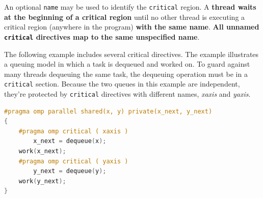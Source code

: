 \noindent
An optional \texttt{name} may be used to identify the \texttt{critical} region. A \textbf{thread waits at the beginning of a critical region} until no other thread is executing a critical region (anywhere in the program) \textbf{with the same name}. \textbf{All unnamed \texttt{critical} directives map to the same unspecified name}.

\begin{examplebox}
    The following example includes several critical directives. The example illustrates a queuing model in which a task is dequeued and worked on. To guard against many threads dequeuing the same task, the dequeuing operation must be in a \texttt{critical} section. Because the two queues in this example are independent, they're protected by \texttt{critical} directives with different names, \emph{xaxis} and \emph{yaxis}.\cite{openMPCriticalDirectiveMicrosoftExample}
    \begin{lstlisting}[language=C++]
#pragma omp parallel shared(x, y) private(x_next, y_next)
{
    #pragma omp critical ( xaxis )
        x_next = dequeue(x);
    work(x_next);
    #pragma omp critical ( yaxis )
        y_next = dequeue(y);
    work(y_next);
}
    \end{lstlisting}
\end{examplebox}

